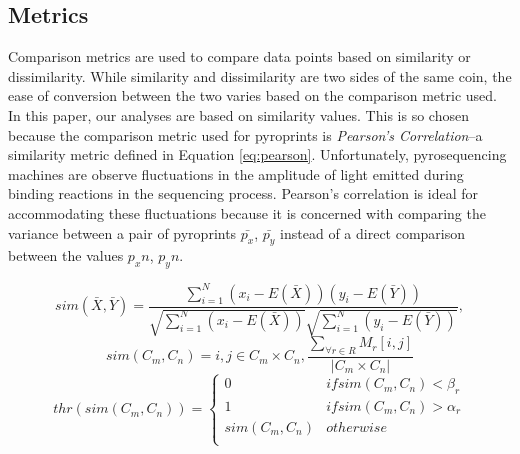 \documentclass[12pt]{ucthesis}
\begin{document}
      \subsection{Metrics}
      Comparison metrics are used to compare data points based on similarity
      or dissimilarity. While similarity and dissimilarity are two sides of
      the same coin, the ease of conversion between the two varies based on
      the comparison metric used. In this paper, our analyses are based on
      similarity values. This is so chosen because the comparison metric used
      for pyroprints is \textit{Pearson's Correlation}--a similarity metric
      defined in Equation \ref{eq:pearson}. Unfortunately, pyrosequencing machines
      are observe fluctuations in the amplitude of light emitted
      during binding reactions in the sequencing process. Pearson's correlation
      is ideal for accommodating these fluctuations because it is
      concerned with comparing the variance between a pair of pyroprints
      $\bar{p_x}$, $\bar{p_y}$ instead of a direct comparison between the
      values $p_xn$, $p_yn$.

      \begin{equation}\label{eq:pearson}
         sim(\bar{X},\bar{Y}) = \frac{\sum_{i=1}^{N}(x_i - E(\bar{X}))(y_i - E(\bar{Y}))}
         {\sqrt{\sum_{i=1}^{N}(x_i-E(\bar{X}))}\sqrt{\sum_{i=1}^{N}(y_i-E(\bar{Y}))}},
      \end{equation}
      \begin{equation}\label{eq:cluster_sim}
         sim(C_m, C_n) = i,j \in C_m \times C_n, \frac{\sum_{\forall r \in
         R}M_r[i,j]} {|C_m \times C_n|}
      \end{equation}
      \begin{equation}\label{eq:threshold}
         thr(sim(C_m, C_n)) = \begin{cases}
                              0 & if sim(C_m, C_n) < \beta_r \\
                              1 & if sim(C_m, C_n) > \alpha_r \\
                              sim(C_m, C_n) & otherwise \\
                              \end{cases}
      \end{equation}
\end{document}
